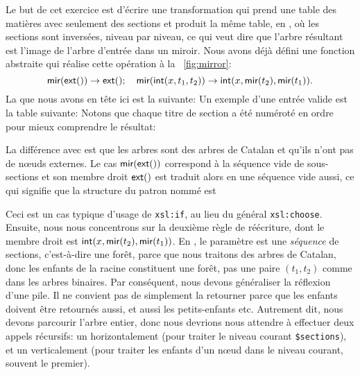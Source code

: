 
Le but de cet exercice est d'écrire une transformation \XSLT qui prend
une table des matières avec seulement des sections et produit la même
table, en \XML, où les sections sont inversées, niveau par niveau, ce
qui veut dire que l'arbre résultant est l'image de l'arbre d'entrée
dans un miroir. Nous avons déjà défini une fonction abstraite
 qui réalise cette opération à la \fig~\vref{fig:mirror}:
\begin{equation*}
\textsf{mir}(\textsf{ext}()) \rightarrow \textsf{ext}();
\quad
\textsf{mir}(\textsf{int}(x,t_1,t_2)) \rightarrow
\textsf{int}(x,\textsf{mir}(t_2),\textsf{mir}(t_1)).
\end{equation*}
\noindent La \DTD que nous avons en tête ici est la suivante:
\noindent Un exemple d'une entrée valide est la table suivante:
\noindent Notons que chaque titre de section a été numéroté en ordre
pour mieux comprendre le résultat:

La différence avec  est que les arbres \XML sont des arbres
de Catalan et qu'ils n'ont pas de n{\oe}uds externes. Le cas
\(\textsf{mir}(\textsf{ext}())\) correspond à la séquence vide de
sous-sections et son membre droit \(\textsf{ext}()\) est traduit alors en
une séquence vide aussi, ce qui signifie que la structure du patron
nommé est
Ceci est un cas typique d'usage de \texttt{xsl:if}, au lieu du général
\texttt{xsl:choose}. Ensuite, nous nous concentrons sur la deuxième
règle de réécriture, dont le membre droit est
\(\textsf{int}(x,\textsf{mir}(t_2),\textsf{mir}(t_1))\). En \XSLT, le paramètre
est une \emph{séquence} de sections, c'est-à-dire une forêt, parce que
nous traitons des arbres de Catalan, donc les enfants de la racine
constituent une forêt, pas une paire \((t_1, t_2)\) comme dans les
arbres binaires. Par conséquent, nous devons généraliser la réflexion
d'une pile. Il ne convient pas de simplement la retourner parce que
les enfants doivent être retournés aussi, et aussi les petits-enfants
etc. Autrement dit, nous devons parcourir l'arbre entier, donc nous
devrions nous attendre à effectuer deux appels récursifs: un
horizontalement (pour traiter le niveau courant \texttt{\$sections}),
et un verticalement (pour traiter les enfants d'un n{\oe}ud dans le
niveau courant, souvent le premier).

